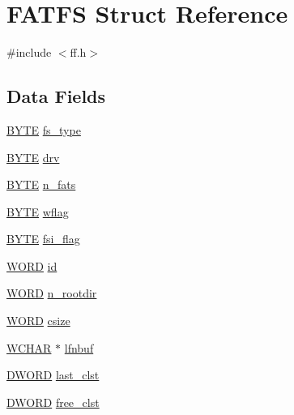 \hypertarget{structFATFS}{}\section{F\+A\+T\+FS Struct Reference}
\label{structFATFS}


{\ttfamily \#include $<$ff.\+h$>$}

\subsection*{Data Fields}
\begin{DoxyCompactItemize}
\item 
\hyperlink{integer_8h_a4ae1dab0fb4b072a66584546209e7d58}{B\+Y\+TE} \hyperlink{structFATFS_add27d97babe807b573eac98a71dc4ae5}{fs\+\_\+type}
\item 
\hyperlink{integer_8h_a4ae1dab0fb4b072a66584546209e7d58}{B\+Y\+TE} \hyperlink{structFATFS_a6a791560e2687e8b1569bfce61208d2d}{drv}
\item 
\hyperlink{integer_8h_a4ae1dab0fb4b072a66584546209e7d58}{B\+Y\+TE} \hyperlink{structFATFS_a56716c7e7ac10cf46e73ffb2a2e9b545}{n\+\_\+fats}
\item 
\hyperlink{integer_8h_a4ae1dab0fb4b072a66584546209e7d58}{B\+Y\+TE} \hyperlink{structFATFS_a647e43c9ccae94b7274793d1909897de}{wflag}
\item 
\hyperlink{integer_8h_a4ae1dab0fb4b072a66584546209e7d58}{B\+Y\+TE} \hyperlink{structFATFS_a84e9cdc5a6a8e33ea7ec192058abf161}{fsi\+\_\+flag}
\item 
\hyperlink{integer_8h_a197942eefa7db30960ae396d68339b97}{W\+O\+RD} \hyperlink{structFATFS_a417095d7c20d56d417dc0998e0dd5a5c}{id}
\item 
\hyperlink{integer_8h_a197942eefa7db30960ae396d68339b97}{W\+O\+RD} \hyperlink{structFATFS_a189a00aa038044ffad0fc7f7dcf2aae1}{n\+\_\+rootdir}
\item 
\hyperlink{integer_8h_a197942eefa7db30960ae396d68339b97}{W\+O\+RD} \hyperlink{structFATFS_ad7fa7a509f8d097a9ab182d6c47be568}{csize}
\item 
\hyperlink{integer_8h_a570001c92f314285ad3e7139d8c58cf7}{W\+C\+H\+AR} $\ast$ \hyperlink{structFATFS_ad1999aa771ae428c3abe14dbe585e981}{lfnbuf}
\item 
\hyperlink{integer_8h_ad342ac907eb044443153a22f964bf0af}{D\+W\+O\+RD} \hyperlink{structFATFS_ac26e848817569fedc15a9a4e49ddedd1}{last\+\_\+clst}
\item 
\hyperlink{integer_8h_ad342ac907eb044443153a22f964bf0af}{D\+W\+O\+RD} \hyperlink{structFATFS_ac834248773bf338df807f0d7e6b6a579}{free\+\_\+clst}

\end{DoxyCompactItemize}

